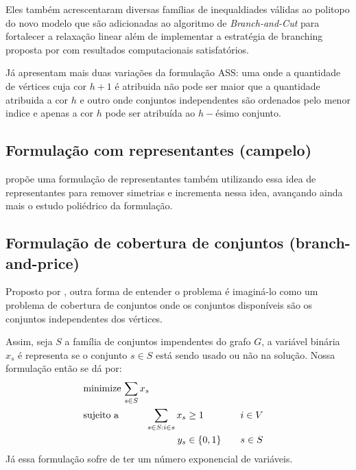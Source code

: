 \documentclass[11pt]{article}
\begin{document}
Eles também acrescentaram diversas famílias de inequaldiades válidas ao politopo do novo modelo que são adicionadas ao algoritmo de \emph{Branch-and-Cut}  para fortalecer a relaxação linear além de implementar a estratégia de branching proposta por \textcite{Brelaz1979Newmethodscolor} com resultados computacionais satisfatórios.

Já \textcite{MendezDiaz2008CuttingPlaneAlgorithm} apresentam mais duas variações da formulação ASS: uma onde a quantidade de vértices cuja cor \(h+1\) é atribuida não pode ser maior que a quantidade atribuida a cor \(h\) e outro onde conjuntos independentes são ordenados pelo menor indice e apenas a cor \(h\) pode ser atribuída ao \(h-\text{ésimo}\) conjunto.

\subsection{Formulação com representantes (campelo)}
\label{sec:org34cc344}
\textcite{Campelo2004CliquesHolesVertex} propõe uma formulação de representantes também utilizando essa idea de representantes para remover simetrias e \textcite{Campelo2008AsymmetricRepresentativesFormulation} incrementa nessa idea, avançando ainda mais o estudo poliédrico da formulação.
\subsection{Formulação de cobertura de conjuntos (branch-and-price)}
\label{sec:orge5351df}
Proposto por \textcite{Mehrotra1996ColumnGenerationApproach}, outra forma de entender o problema é imaginá-lo como um problema de cobertura de conjuntos onde os conjuntos disponíveis são os conjuntos independentes dos vértices.

Assim, seja \(S\) a família de conjuntos impendentes do grafo \(G\), a variável binária \(x_s\) é representa se o conjunto \(s \in S\) está sendo usado ou não na solução. Nossa formulação então se dá por:
\begin{alignat*}{4}
& \omit\rlap{minimize  $\displaystyle \sum_{s \in S} x_s$} \\
& \mbox{sujeito a}&& \quad & \sum_{s \in S: i \in s} x_{s}&\geq 1 & \quad & i \in V \label{rest9} \\
&                 &&   & y_s       & \in \{0,1\} &    & s \in S
\end{alignat*}
Já essa formulação sofre de ter um número exponencial de variáveis.
\end{document}
